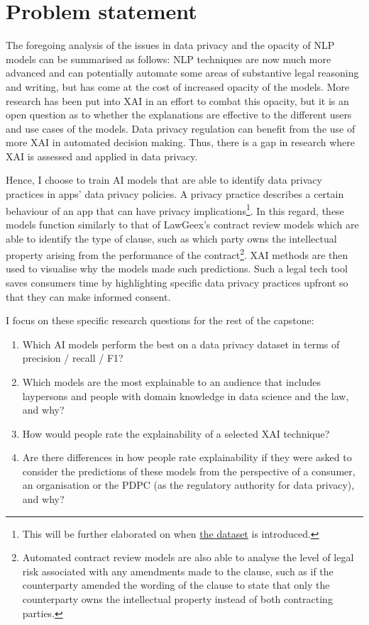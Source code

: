 \section{Problem statement}
The foregoing analysis of the issues in data privacy and the opacity of NLP models can be summarised as follows: NLP techniques are now much more advanced and can potentially automate some areas of substantive legal reasoning and writing, but has come at the cost of increased opacity of the models. More research has been put into XAI in an effort to combat this opacity, but it is an open question as to whether the explanations are effective to the different users and use cases of the models. Data privacy regulation can benefit from the use of more XAI in automated decision making. Thus, there is a gap in research where XAI is assessed and applied in data privacy. 

Hence, I choose to train AI models that are able to identify data privacy practices in apps' data privacy policies. A privacy practice describes a certain behaviour of an app that can have privacy implications\footnote{This will be further elaborated on when \hyperref[app350_corpus]{the dataset} is introduced.}. In this regard, these models function similarly to that of LawGeex's contract review models which are able to identify the type of clause, such as which party owns the intellectual property arising from the performance of the contract\footnote{Automated contract review models are also able to analyse the level of legal risk associated with any amendments made to the clause, such as if the counterparty amended the wording of the clause to state that only the counterparty owns the intellectual property instead of both contracting parties.}. XAI methods are then used to visualise why the models made such predictions. Such a legal tech tool saves consumers time by highlighting specific data privacy practices upfront so that they can make informed consent. 

I focus on these specific research questions for the rest of the capstone:

\begin{enumerate}
  \item Which AI models perform the best on a data privacy dataset in terms of precision / recall / F1?
  \item Which models are the most explainable to an audience that includes laypersons and people with domain knowledge in data science and the law, and why?
  \item How would people rate the explainability of a selected XAI technique?
  \item Are there differences in how people rate explainability if they were asked to consider the predictions of these models from the perspective of a consumer, an organisation or the PDPC (as the regulatory authority for data privacy), and why?
\end{enumerate}

